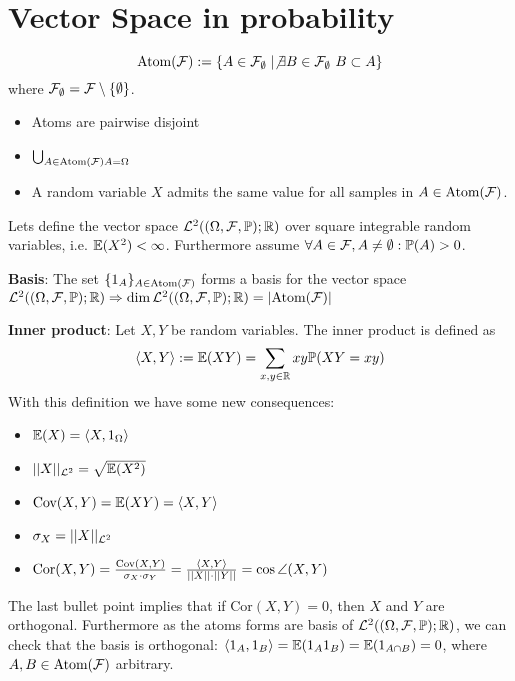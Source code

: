 \section{Vector Space in probability}
\begin{definition*}[Atoms of \(\F\)]
  \[\text{Atom}(\mathcal{F}) := \{A \in \mathcal{F}_{\emptyset} \mid \not \exists B \in \mathcal{F}_{\emptyset} \ B \subset A\}\]
  where \(\mathcal{F}_{\emptyset} = \mathcal{F} \setminus \{\emptyset\}\).
\end{definition*}
\begin{itemize}
  \item Atoms are pairwise disjoint
  \item \(\bigcup_{A \in \text{Atom}(\mathcal{F}) A = \Omega}\)
  \item A random variable \(X\) admits the same value for all samples in \(A \in \text{Atom}(\mathcal{F})\).
\end{itemize}


Lets define the vector space \(\mathcal{L}^2((\Omega, \mathcal{F}, \mathbb{P}); \mathbb{R})\) over square integrable random variables, i.e. \(\mathbb{E}(X^2) < \infty\). Furthermore assume \(\forall A \in \mathcal{F}, A \neq \emptyset: \mathbb{P}(A) > 0\).

\textbf{Basis}: The set \(\{1_A\}_{A \in \text{Atom}(\mathcal{F})}\) forms a basis for the vector space \(\mathcal{L}^2((\Omega, \mathcal{F}, \mathbb{P}); \mathbb{R}) \Rightarrow \text{dim} \, \mathcal{L}^2((\Omega, \mathcal{F}, \mathbb{P}); \mathbb{R}) = |\text{Atom}(\mathcal{F})|\)

\textbf{Inner product}: Let \(X, Y\) be random variables. The inner product is defined as
\[\langle X, Y \rangle := \mathbb{E}(XY) = \sum_{x, y \in \mathbb{R}} xy \mathbb{P}(XY = xy)\]
With this definition we have some new consequences:
\begin{itemize}
  \item \(\mathbb{E}(X) = \langle X, 1_\Omega \rangle\)
  \item \(||X||_{\mathcal{L}^2} = \sqrt{\mathbb{E}(X^2)}\)
  \item \(\text{Cov}(X, Y) = \mathbb{E}(XY) = \langle X, Y \rangle\)
  \item \(\sigma_X = ||X||_{\mathcal{L}^2}\)
  \item \(\text{Cor}(X, Y) = \frac{\text{Cov}(X, Y)}{\sigma_X \cdot \sigma_Y} = \frac{\langle X, Y \rangle}{||X|| \cdot ||Y||} = \cos \angle (X, Y)\)
\end{itemize}
The last bullet point implies that if \(\text{Cor}(X, Y) = 0\), then \(X\) and \(Y\) are orthogonal. Furthermore as the atoms forms are basis of \(\mathcal{L}^2((\Omega, \mathcal{F}, \mathbb{P}); \mathbb{R})\), we can check that the basis is orthogonal: \(\langle 1_A, 1_B \rangle = \mathbb{E}(1_A 1_B) = \mathbb{E}(1_{A \cap B}) = 0\), where \(A, B \in \text{Atom}(\mathcal{F})\) arbitrary.

